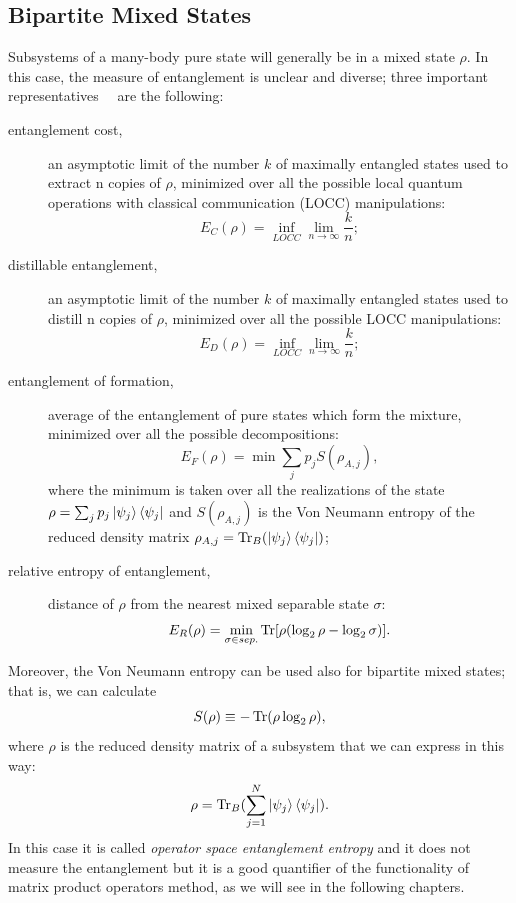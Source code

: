 \subsection{Bipartite Mixed States}
\label{bi_mixed_states}
Subsystems of a many-body pure state will generally be in a mixed state $\rho$. In this case, the measure of entanglement is unclear and diverse; three important representatives~\cite{RevModPhys.80.517}~\cite{phd_ross} are the following:
\begin{description}
    \item[entanglement cost,] an asymptotic limit of the number $k$ of maximally entangled states used to extract n copies of $\rho$, minimized over all the possible local quantum operations with classical communication (LOCC) manipulations:
    \begin{equation*}
        E_C(\rho) = \inf_{LOCC}\lim_{n\to\infty} \frac{k}{n};
    \end{equation*}
    \item[distillable entanglement,] an asymptotic limit of the number $k$ of maximally entangled states used to distill n copies of $\rho$, minimized over all the possible LOCC manipulations:
    \begin{equation*}
        E_D(\rho) = \inf_{LOCC}\lim_{n\to\infty} \frac{k}{n};
    \end{equation*}
    \item[entanglement of formation,] average of the entanglement of pure states which form the mixture, minimized over all the possible decompositions:
    \begin{equation*}
        E_F(\rho) = \min \sum_j p_j S(\rho_{A,j}),
    \end{equation*}
    where the minimum is taken over all the realizations of the state $\rho = \sum_j p_j \ket{\psi_j}\bra{\psi_j}$ and $S(\rho_{A,j})$ is the Von Neumann entropy of the reduced density matrix $\rho_{A,j} = \operatorname{Tr}_B (\ket{\psi_j}\bra{\psi_j})$;
    \item[relative entropy of entanglement,] distance of $\rho$ from the nearest mixed separable state $\sigma$:
    \begin{equation*}
        E_R(\rho) = \min_{\sigma \in sep.} \operatorname{Tr}[\rho(\log_2 \rho -\log_2 \sigma)].
    \end{equation*}
\end{description}

Moreover, the Von Neumann entropy can be used also for bipartite mixed states; that is, we can calculate
\begin{equation*}
    S(\rho) \equiv -\operatorname{Tr} ( \rho \log_2\rho),
\end{equation*}
where $\rho$ is the reduced density matrix of a subsystem that we can express in this way:
\begin{equation*}
    \rho = \operatorname{Tr}_B (\sum_{j = 1}^{N}\ket{\psi_{j}}\bra{\psi_j}).
\end{equation*}
In this case it is called \emph{operator space entanglement entropy} and it does not measure the entanglement but it is a good quantifier of the functionality of matrix product operators method, as we will see in the following chapters.

